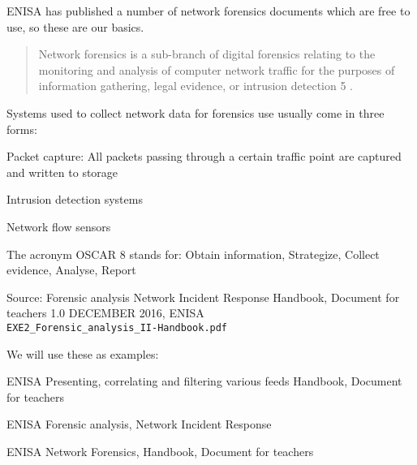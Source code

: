 \documentclass[Screen16to9,17pt]{foils}
\begin{document}

ENISA has published a number of network forensics documents which are free to use, so these are our basics.


\begin{quote}
Network forensics is a sub-branch of digital forensics relating to the monitoring and analysis of computer
network traffic for the purposes of information gathering, legal evidence, or intrusion detection 5 .
\end{quote}

\begin{list1}
\item Systems used to collect network data for forensics use usually come in three forms:
\begin{list2}
\item Packet capture: All packets passing through a certain traffic point are captured and written to storage
\item Intrusion detection systems
\item Network flow sensors
\end{list2}
\end{list1}

The acronym OSCAR 8 stands for: Obtain information,
Strategize,
Collect evidence,
Analyse,
Report

Source: Forensic analysis Network Incident Response Handbook, Document for teachers 1.0 DECEMBER 2016, ENISA\\
\verb+EXE2_Forensic_analysis_II-Handbook.pdf+





\begin{list2}
\item We will use these as examples:
\item ENISA Presenting, correlating and filtering various feeds Handbook, Document for teachers\\ 
\item ENISA Forensic analysis, Network Incident Response\\ 
\item ENISA Network Forensics, Handbook, Document for teachers\\ 
\end{list2}






\slidenext
\end{document}
